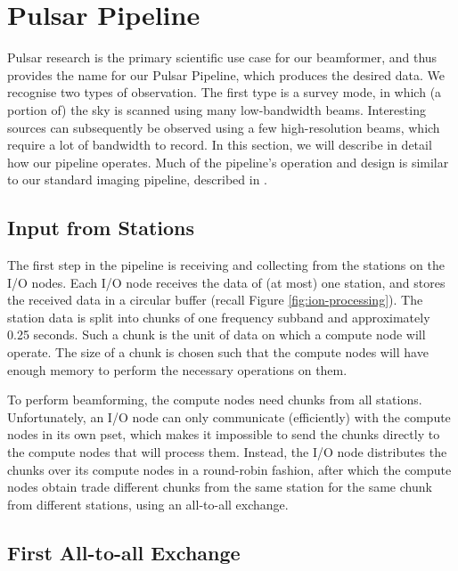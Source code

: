 \documentclass{llncs}
\begin{document}
\section{Pulsar Pipeline}

Pulsar research is the primary scientific use case for our beamformer, and thus provides the name for our Pulsar Pipeline, which produces the desired data. We recognise two types of observation. The first type is a survey mode, in which (a portion of) the sky is scanned using many low-bandwidth beams. Interesting sources can subsequently be observed using a few high-resolution beams, which require a lot of bandwidth to record. In this section, we will describe in detail how our pipeline operates. Much of the pipeline's operation and design is similar to our standard imaging pipeline, described in \cite{Romein:10a}.

\subsection{Input from Stations}

The first step in the pipeline is receiving and collecting from the stations on the I/O nodes. Each I/O node receives the data of (at most) one station, and stores the received data in a circular buffer (recall Figure \ref{fig:ion-processing}). The station data is split into chunks of one frequency subband and approximately 0.25 seconds. Such a chunk is the unit of data on which a compute node will operate. The size of a chunk is chosen such that the compute nodes will have enough memory to perform the necessary operations on them.

To perform beamforming, the compute nodes need chunks from all stations. Unfortunately, an I/O node can only communicate (efficiently) with the compute nodes in its own pset, which makes it impossible to send the chunks directly to the compute nodes that will process them. Instead, the I/O node distributes the chunks over its compute nodes in a round-robin fashion, after which the compute nodes obtain trade different chunks from the same station for the same chunk from different stations, using an all-to-all exchange.

\subsection{First All-to-all Exchange}

\end{document}
